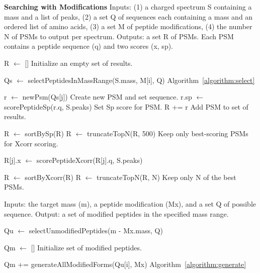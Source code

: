 \documentclass[12pt]{article}
\begin{document}
\begin{algorithm}
\caption{{\bf Searching with Modifications} Inputs: (1) a charged
  spectrum S containing a mass and a list of peaks, (2) a set Q of
  sequences each containing a mass and an ordered list of amino acids,
  (3) a set M of peptide modifications, (4) the number N of PSMs to
  output per spectrum. Outputs: a set R of PSMs.  Each PSM contains a
  peptide sequence (q) and two scores (x, sp).
  \label{algorithm:search}}

\begin{algorithmic}[1]

\State R $\gets$ []
\Comment Initialize an empty set of results.

   \State Qs $\gets$ selectPeptidesInMassRange(S.mass, M[i], Q)
   \Comment Algorithm~\ref{algorithm:select}
   
     \State r $\gets$ newPsm(Qs[j])
     \Comment Create new PSM and set sequence.
     \State r.sp $\gets$ scorePeptideSp(r.q, S.peaks)
     \Comment Set Sp score for PSM.
     \State R += r
     \Comment Add PSM to set of results.
   \EndFor

   \State R $\gets$ sortBySp(R)
   \State R $\gets$ truncateTopN(R, 500)
   \Comment Keep only best-scoring PSMs for Xcorr scoring.

     \State R[j].x $\gets$ scorePeptideXcorr(R[j].q, S.peaks)
   \EndFor

   \State R $\gets$ sortByXcorr(R)
   \State R $\gets$ truncateTopN(R, N)
   \Comment Keep only N of the best PSMs.

\EndFor

\State {}
\EndProcedure
\end{algorithmic}
\end{algorithm}

\begin{algorithm}
\caption{ Inputs: the target mass (m), a peptide modification (Mx),
  and a set Q of possible sequence.  Output: a set of modified
  peptides in the specified mass range.
  \label{algorithm:select}}

\begin{algorithmic}[1]
  \State Qu $\gets$ selectUnmodifiedPeptides(m - Mx.mass, Q)
   
  \State Qm $\gets$ []
  \Comment Initialize set of modified peptides.

      \State Qm += generateAllModifiedForms(Qu[i], Mx)
      \Comment Algorithm~\ref{algorithm:generate}
    \EndIf
  \EndFor

  \State {}
\EndProcedure
\end{algorithmic}
\end{algorithm}
\end{document}
